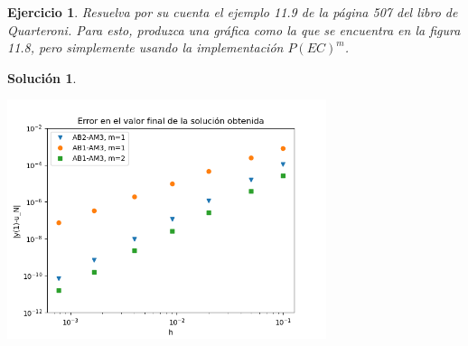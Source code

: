 \documentclass[11pt]{article}
\newtheorem{exercise}{Ejercicio}
\newtheorem*{sol}{Solución}
\begin{document}
\begin{exercise}
  Resuelva por su cuenta el ejemplo 11.9 de la página 507 del libro de
  Quarteroni. Para esto, produzca una gráfica como la que se encuentra
  en la figura 11.8, pero simplemente usando la implementación
  $P(EC)^{m}$.
\end{exercise}
\begin{sol}
  \leavevmode
  \begin{center}
  \includegraphics[width=0.7\textwidth]
  {img/jaac_tarea2_ejercicio5.png}
  \end{center}
\end{sol}
\end{document}
